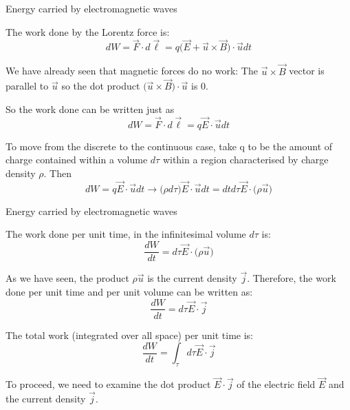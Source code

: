 \begin{frame}{Energy carried by electromagnetic waves}

The work done by the Lorentz force is:
\begin{equation*}
  dW = \vec{F} \cdot d\vec{\ell} = q \Big( \vec{E} + \vec{u} \times \vec{B} \Big) \cdot \vec{u} dt
\end{equation*}

We have already seen that magnetic forces do no work:
The $\vec{u} \times \vec{B}$ vector is parallel to $\vec{u}$ so the dot product
$\Big( \vec{u} \times \vec{B} \Big) \cdot \vec{u}$ is 0.

So the work done can be written just as
\begin{equation*}
  dW = \vec{F} \cdot d\vec{\ell} = q \vec{E} \cdot \vec{u} dt
\end{equation*}

To move from the discrete to the continuous case, take q to be the amount of charge contained
within a volume $d\tau$ within a region characterised by charge density $\rho$.
Then
\begin{equation*}
  dW = q \vec{E} \cdot \vec{u} dt \rightarrow \Big( \rho d\tau \Big) \vec{E} \cdot \vec{u} dt =
           dt d\tau \vec{E} \cdot \Big( \rho \vec{u} \Big)
\end{equation*}


\end{frame}


%
%
%
%

\begin{frame}{Energy carried by electromagnetic waves}

The work done per unit time, in the infinitesimal volume $d\tau$ is:
\begin{equation*}
  \frac{dW}{dt} =  d\tau \vec{E}  \cdot \Big( \rho \vec{u} \Big)
\end{equation*}

As we have seen, the product $\rho \vec{u}$ is the current density $\vec{j}$. Therefore, the work done per unit time and per unit volume can be written as:
\begin{equation*}
  \frac{dW}{dt} =  d\tau \vec{E}  \cdot \vec{j}
\end{equation*}

The total work (integrated over all space) per unit time is:
\begin{equation*}
  \frac{dW}{dt} =  \int_{\tau} d\tau \vec{E} \cdot \vec{j}
\end{equation*}

To proceed, we need to examine the dot product $\vec{E} \cdot \vec{j}$ of the electric field $\vec{E}$ and the current density $\vec{j}$.

\end{frame}


